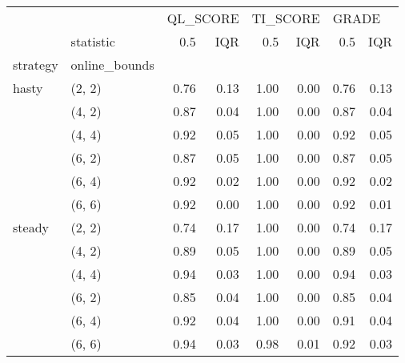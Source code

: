 \begin{tabular}{llrrrrrr}
\toprule
       & {} & \multicolumn{2}{l}{QL\_SCORE} & \multicolumn{2}{l}{TI\_SCORE} & \multicolumn{2}{l}{GRADE} \\
       & statistic &      0.5 &  IQR &      0.5 &  IQR &   0.5 &  IQR \\
strategy & online\_bounds &          &      &          &      &       &      \\
\midrule
hasty & (2, 2) &     0.76 & 0.13 &     1.00 & 0.00 &  0.76 & 0.13 \\
       & (4, 2) &     0.87 & 0.04 &     1.00 & 0.00 &  0.87 & 0.04 \\
       & (4, 4) &     0.92 & 0.05 &     1.00 & 0.00 &  0.92 & 0.05 \\
       & (6, 2) &     0.87 & 0.05 &     1.00 & 0.00 &  0.87 & 0.05 \\
       & (6, 4) &     0.92 & 0.02 &     1.00 & 0.00 &  0.92 & 0.02 \\
       & (6, 6) &     0.92 & 0.00 &     1.00 & 0.00 &  0.92 & 0.01 \\
steady & (2, 2) &     0.74 & 0.17 &     1.00 & 0.00 &  0.74 & 0.17 \\
       & (4, 2) &     0.89 & 0.05 &     1.00 & 0.00 &  0.89 & 0.05 \\
       & (4, 4) &     0.94 & 0.03 &     1.00 & 0.00 &  0.94 & 0.03 \\
       & (6, 2) &     0.85 & 0.04 &     1.00 & 0.00 &  0.85 & 0.04 \\
       & (6, 4) &     0.92 & 0.04 &     1.00 & 0.00 &  0.91 & 0.04 \\
       & (6, 6) &     0.94 & 0.03 &     0.98 & 0.01 &  0.92 & 0.03 \\
\bottomrule
\end{tabular}
